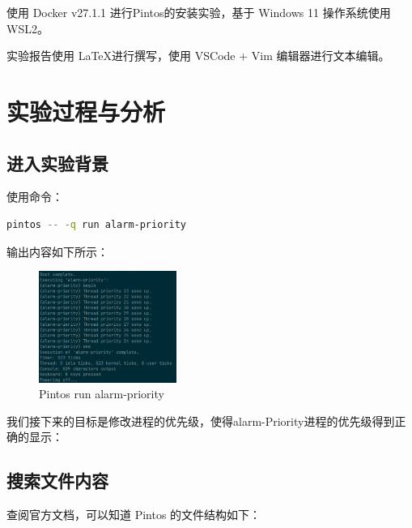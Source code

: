 使用 Docker v27.1.1 进行Pintos的安装实验，基于 Windows 11 操作系统使用 WSL2。

实验报告使用 \LaTeX 进行撰写，使用 VSCode + Vim 编辑器进行文本编辑。

\section{实验过程与分析}

\subsection{进入实验背景}

使用命令：

\begin{lstlisting}[language = bash, title = { Init }]
    pintos -- -q run alarm-priority
\end{lstlisting}

输出内容如下所示：

\begin{figure}[H]
    \centering
    \includegraphics[width=0.4\textwidth]{img3/start.png}
    \caption{Pintos run alarm-priority}
    \label{fig:pintos-run-alarm-priority}
\end{figure}

我们接下来的目标是修改进程的优先级，使得alarm-Priority进程的优先级得到正确的显示：

\subsection{搜索文件内容}

查阅官方文档，可以知道 Pintos 的文件结构如下：

